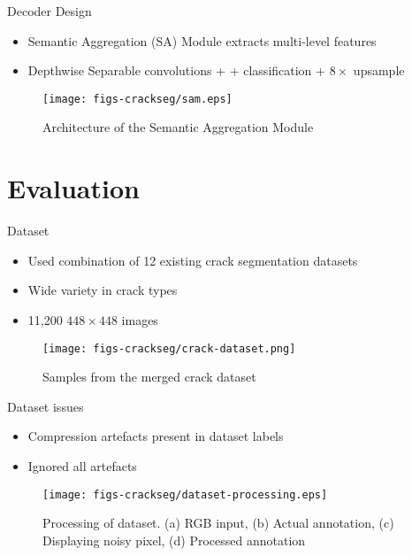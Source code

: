 \documentclass{lib/curtin_format}
\begin{document}
\begin{frame}{Decoder Design}
\begin{itemize}
        \item Semantic Aggregation (SA) Module extracts multi-level features
        \item Depthwise Separable convolutions + + classification + $8 \times$ upsample
    \end{itemize}
   \begin{figure}
        \centering        
        \texttt{[image: figs-crackseg/sam.eps]}
        \caption{Architecture of the Semantic Aggregation Module}
        \label{fig:pipeline}
    \end{figure}
\end{frame}



\section{Evaluation}
\begin{frame}{Dataset}
\begin{itemize}
        \item Used combination of 12 existing crack segmentation datasets
        \item Wide variety in crack types
        \item 11,200 $448 \times 448$ images
    \end{itemize}
   \begin{figure}
        \centering        
        \texttt{[image: figs-crackseg/crack-dataset.png]}
        \caption{Samples from the merged crack dataset}
        \label{Fig:annotation}
    \end{figure}
\end{frame}

\begin{frame}{Dataset issues}
\begin{itemize}
        \item Compression artefacts present in dataset labels
        \item Ignored all artefacts
    \end{itemize}
   \begin{figure}
        \centering        
        \texttt{[image: figs-crackseg/dataset-processing.eps]}
        \caption{Processing of dataset. (a) RGB input, (b) Actual annotation, (c) Displaying noisy pixel, (d) Processed annotation}
        \label{Fig:annotation}
    \end{figure}
\end{frame}
\end{document}

